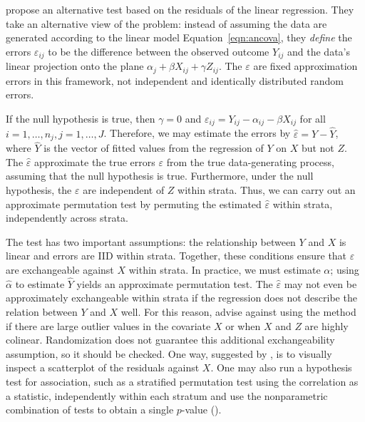 \documentclass[12pt]{article}
\begin{document}
\citet{freedman_nonstochastic_1983} propose an alternative test based on the residuals of the linear regression.
They take an alternative view of the problem:
instead of assuming the data are generated according to the linear model Equation~\ref{eqn:ancova}, they \textit{define} the errors $\varepsilon_{ij}$ to be the difference between the observed outcome $Y_{ij}$ and the data's linear projection onto the plane $\alpha_j + \beta X_{ij}+ \gamma Z_{ij}$.
The $\varepsilon$ are fixed approximation errors in this framework, not independent and identically distributed random errors.

If the null hypothesis is true, then $\gamma = 0$ and $\varepsilon_{ij} = Y_{ij} - \alpha_{ij} - \beta X_{ij}$ for all $i = 1, \dots, n_j, j = 1, \dots, J$.
Therefore, we may estimate the errors by $\hat{\varepsilon} =Y - \hat{Y}$, where $\hat{Y}$ is the vector of fitted values from the regression of $Y$ on $X$ but not $Z$.
The $\hat{\varepsilon}$ approximate the true errors $\varepsilon$ from the true data-generating process, assuming that the null hypothesis is true.
Furthermore, under the null hypothesis, the $\varepsilon$ are independent of $Z$ within strata. 
Thus, we can carry out an approximate permutation test by permuting the estimated $\hat{\varepsilon}$ within strata, independently across strata.

The test has two important assumptions:
the relationship between $Y$ and $X$ is linear and errors are IID within strata.
Together, these conditions ensure that $\varepsilon$ are exchangeable against $X$ within strata.
In practice, we must estimate $\alpha$; using $\hat{\alpha}$ to estimate $\hat{Y}$ yields an approximate permutation test.
The $\hat{\varepsilon}$ may not even be approximately exchangeable within strata if the regression does not describe the relation between $Y$ and $X$ well.
For this reason, \cite{freedman_nonstochastic_1983} advise against using the method if there are large outlier values in the covariate $X$ or when $X$ and $Z$ are highly colinear.
Randomization does not guarantee this additional exchangeability assumption, so it should be checked.
One way, suggested by \cite{freedman_nonstochastic_1983}, is to visually inspect a scatterplot of the residuals against $X$.
One may also run a hypothesis test for association, such as a stratified permutation test using the correlation as a statistic, independently within each stratum and use the nonparametric combination of tests to obtain a single $p$-value (\cite{pesarin_permutation_2010}).
\end{document}
